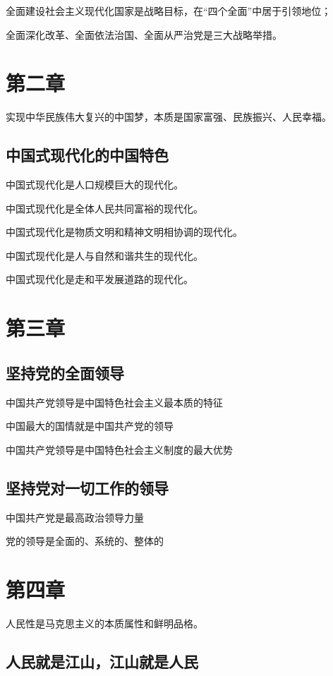 \documentclass[11pt, a4paper]{article}
\begin{document}
全面建设社会主义现代化国家是战略目标，在“四个全面”中居于引领地位；

全面深化改革、全面依法治国、全面从严治党是三大战略举措。

\section*{第二章}

实现中华民族伟大复兴的中国梦，本质是国家富强、民族振兴、人民幸福。

\subsection*{中国式现代化的中国特色}

中国式现代化是人口规模巨大的现代化。

中国式现代化是全体人民共同富裕的现代化。

中国式现代化是物质文明和精神文明相协调的现代化。

中国式现代化是人与自然和谐共生的现代化。

中国式现代化是走和平发展道路的现代化。

\section*{第三章}

\subsection*{坚持党的全面领导}

中国共产党领导是中国特色社会主义最本质的特征

中国最大的国情就是中国共产党的领导

中国共产党领导是中国特色社会主义制度的最大优势

\subsection*{坚持党对一切工作的领导}

中国共产党是最高政治领导力量

党的领导是全面的、系统的、整体的

\section*{第四章}

人民性是马克思主义的本质属性和鲜明品格。

\subsection*{人民就是江山，江山就是人民}
\end{document}

